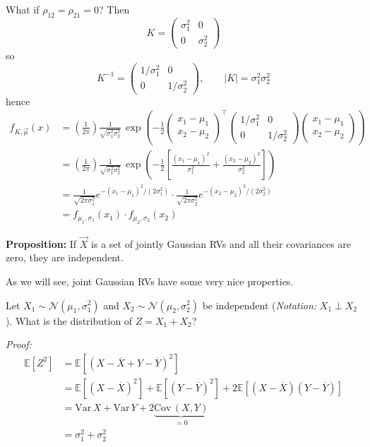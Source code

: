 \documentclass[12pt]{report}
\newcommand{\E}{\mathbb{E}}
\newcommand{\abs}[1]{\left\vert #1 \right\vert}
\newcommand{\Nc}{\mathcal{N}}
\renewcommand{\bar}[1]{\overline{#1}}
\newcommand{\Var}{\text{Var}\,}
\newcommand{\Cov}{\text{Cov}\,}
\newenvironment*{tbox}[2][gray]{
    \begin{tcolorbox}[
        parbox=false,
        colback=#1!5!white,
        colframe=#1!75!black,
        breakable,
        title={#2}
    ]}
    {\end{tcolorbox}}
\newenvironment*{proposition}[1][gray]{
    \begin{tcolorbox}[
        parbox=false,
        colback=#1!5!white,
        colframe=#1!75!black,
        breakable
    ]}
    {\end{tcolorbox}}
\begin{document}
What if $\rho_{12} = \rho_{21} = 0$? Then 
\[K = \begin{pmatrix}
    \sigma_1^2 & 0\\ 
    0 & \sigma_2^2
\end{pmatrix}\]
so 
\[K^{-1} = \begin{pmatrix}
    1/\sigma_1^2 & 0\\ 
    0 & 1/\sigma_2^2
\end{pmatrix}, \qquad \abs K = \sigma_1^2 \sigma_2^2\]
hence 
\begin{align*}
    f_{K, \vec \mu}(x) &= \left(\frac{1}{2\pi}\right) \frac{1}{\sqrt{\sigma_1^2 \sigma_2^2}} \,\exp\left(-\frac{1}{2} \begin{pmatrix}
        x_1 - \mu_1\\ 
        x_2 - \mu_2
    \end{pmatrix}^{\top} \begin{pmatrix}
        1/\sigma_1^2 & 0\\ 
        0 & 1/\sigma_2^2
    \end{pmatrix} \begin{pmatrix}
        x_1 - \mu_1\\ 
        x_2 - \mu_2
    \end{pmatrix}\right)\\ 
    &= \left(\frac{1}{2\pi}\right) \frac{1}{\sqrt{\sigma_1^2 \sigma_2^2}} \,\exp\left(-\frac{1}{2} \left[\frac{(x_1 - \mu_1)^2}{\sigma_1^2} + \frac{(x_2 - \mu_2)^2}{\sigma_2^2}\right]\right)\\
    &= \frac{1}{\sqrt{2\pi \sigma_1^2}} e^{-(x_1 - \mu_1)^2/(2\sigma_1^2)} \cdot \frac{1}{\sqrt{2\pi \sigma_2^2}} e^{-(x_2 - \mu_2)^2/(2\sigma_2^2)}\\
    &= f_{\mu_1, \sigma_1}(x_1) \cdot f_{\mu_2, \sigma_2}(x_2)
\end{align*}

\begin{proposition}
    \textbf{Proposition:} If $\vec X$ is a set of jointly Gaussian RVs and all their covariances are zero, they are independent. 
\end{proposition}

As we will see, joint Gaussian RVs have some very nice properties. 

Let $X_1 \sim \Nc(\mu_1, \sigma_1^2)$ and $X_2 \sim \Nc(\mu_2, \sigma_2^2)$ be independent (\emph{Notation:} $X_1 \perp X_2$). What is the distribution of $Z = X_1 + X_2$? 

\begin{tbox}{\textbf{Lemma:} For $X, Y$ independent and $Z = X + Y$, $\Var Z = \Var X + \Var Y$
}
    \emph{Proof:} 
    \begin{align*}
        \E[Z^2] &= \E[(X - \bar X + Y - \bar Y)^2 ]\\ 
        &= \E[(X - \bar X)^2] + \E[(Y - \bar Y)^2] + 2\E[(X - \bar X)(Y - \bar Y)]\\
        &= \Var X + \Var Y + 2 \underbrace{\Cov(X, Y)}_{= 0}\\
        &= \sigma_1^2 + \sigma_2^2 
    \end{align*}
\end{tbox}
\end{document}
